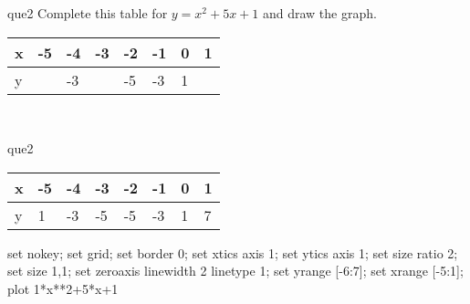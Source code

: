 \documentclass[13.5pt, varwidth=true]{beamer}
\begin{document}
\begin{frame}[shrink=19,fragile]
	\begin{beamercolorbox}[rounded=true, left, shadow=true,wd=14.8cm]{que2}
		 Complete this table for $y = x^{2} + 5x + 1$ and draw the graph. \\[0.3cm] \renewcommand{\arraystretch}{1.2}\begin{tabular}{|C|C|C|C|C|C|C|C|} \hline x & -5 & -4 & -3 & -2 & -1 & 0 & 1 \\ \hline y &  & -3 &  & -5 & -3 & 1 & \\ \hline \end{tabular}\\[0.3cm]
	\end{beamercolorbox}
\end{frame}
\begin{frame}[shrink=19,fragile]
	\begin{beamercolorbox}[rounded=true, left, shadow=true,wd=14.8cm]{que2}
		\renewcommand{\arraystretch}{1.2}\begin{tabular}{|C|C|C|C|C|C|C|C|} \hline x & -5 & -4 & -3 & -2 & -1 & 0 & 1 \\ \hline y & 1 & -3 & -5 & -5 & -3 & 1 & 7\\ \hline \end{tabular}\begin{gnuplot}[terminal=pdf] set nokey; set grid; set border 0; set xtics axis 1; set ytics axis 1; set size ratio 2; set size 1,1; set zeroaxis linewidth 2 linetype 1; set yrange [-6:7]; set xrange [-5:1]; plot 1*x**2+5*x+1 \end{gnuplot}
	\end{beamercolorbox}
\end{frame}
\end{document}

